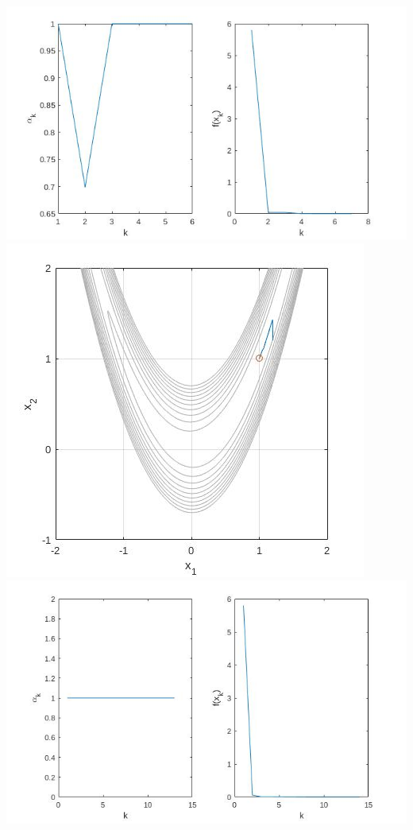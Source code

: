 \documentclass{article}
\begin{document}
\includegraphics[width=\linewidth]{a9_easy_newton_a_f.jpg}
\includegraphics[width=\linewidth]{a9_easy_newton.jpg}
\includegraphics[width=\linewidth]{a9_easy_bfgs_a_f.jpg}
\end{document}
